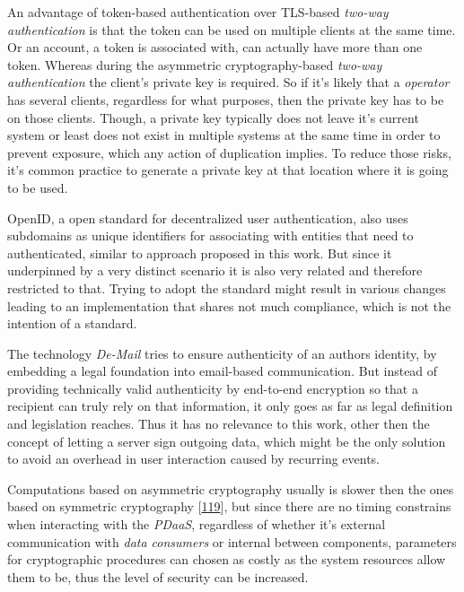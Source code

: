 \documentclass[12pt,english,a4paper,titlepage,cleardoublepage=empty,dottedtoc]{report}
\begin{document}
An advantage of token-based authentication over TLS-based \emph{two-way
authentication} is that the token can be used on multiple clients at the
same time. Or an account, a token is associated with, can actually have
more than one token. Whereas during the asymmetric cryptography-based
\emph{two-way authentication} the client's private key is required. So
if it's likely that a \emph{operator} has several clients, regardless
for what purposes, then the private key has to be on those clients.
Though, a private key typically does not leave it's current system or
least does not exist in multiple systems at the same time in order to
prevent exposure, which any action of duplication implies. To reduce
those risks, it's common practice to generate a private key at that
location where it is going to be used.

OpenID, a open standard for decentralized user authentication, also uses
subdomains as unique identifiers for associating with entities that need
to authenticated, similar to approach proposed in this work. But since
it underpinned by a very distinct scenario it is also very related and
therefore restricted to that. Trying to adopt the standard might result
in various changes leading to an implementation that shares not much
compliance, which is not the intention of a standard.

The technology \emph{De-Mail} tries to ensure authenticity of an authors
identity, by embedding a legal foundation into email-based
communication. But instead of providing technically valid authenticity
by end-to-end encryption so that a recipient can truly rely on that
information, it only goes as far as legal definition and legislation
reaches. Thus it has no relevance to this work, other then the concept
of letting a server sign outgoing data, which might be the only solution
to avoid an overhead in user interaction caused by recurring events.

Computations based on asymmetric cryptography usually is slower then the
ones based on symmetric cryptography
{[}\protect\hyperlink{ref-book_2014_chapter-10-5-asym-random-number-gen}{119}{]},
but since there are no timing constrains when interacting with the
\emph{PDaaS}, regardless of whether it's external communication with
\emph{data consumers} or internal between components, parameters for
cryptographic procedures can chosen as costly as the system resources
allow them to be, thus the level of security can be increased.
\end{document}
